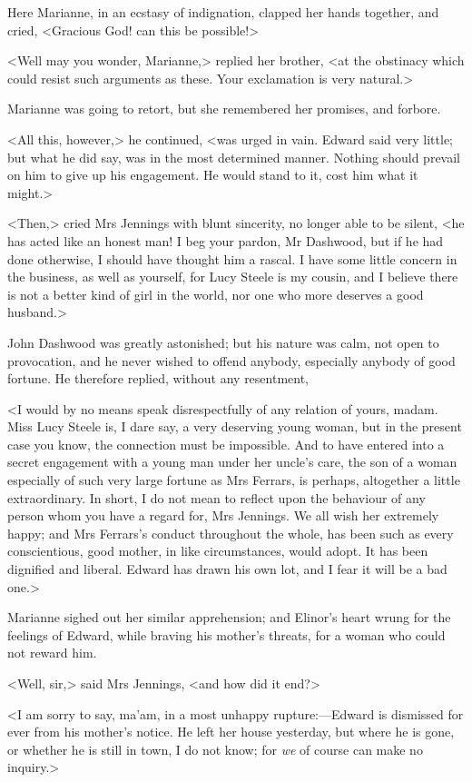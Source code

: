 Here Marianne, in an ecstasy of indignation, clapped her hands together, and cried, <Gracious God! can this be possible!>

<Well may you wonder, Marianne,> replied her brother, <at the obstinacy which could resist such arguments as these. Your exclamation is very natural.>

Marianne was going to retort, but she remembered her promises, and forbore.

<All this, however,> he continued, <was urged in vain. Edward said very little; but what he did say, was in the most determined manner. Nothing should prevail on him to give up his engagement. He would stand to it, cost him what it might.>

<Then,> cried Mrs Jennings with blunt sincerity, no longer able to be silent, <he has acted like an honest man! I beg your pardon, Mr Dashwood, but if he had done otherwise, I should have thought him a rascal. I have some little concern in the business, as well as yourself, for Lucy Steele is my cousin, and I believe there is not a better kind of girl in the world, nor one who more deserves a good husband.>

John Dashwood was greatly astonished; but his nature was calm, not open to provocation, and he never wished to offend anybody, especially anybody of good fortune. He therefore replied, without any resentment,

<I would by no means speak disrespectfully of any relation of yours, madam. Miss Lucy Steele is, I dare say, a very deserving young woman, but in the present case you know, the connection must be impossible. And to have entered into a secret engagement with a young man under her uncle's care, the son of a woman especially of such very large fortune as Mrs Ferrars, is perhaps, altogether a little extraordinary. In short, I do not mean to reflect upon the behaviour of any person whom you have a regard for, Mrs Jennings. We all wish her extremely happy; and Mrs Ferrars's conduct throughout the whole, has been such as every conscientious, good mother, in like circumstances, would adopt. It has been dignified and liberal. Edward has drawn his own lot, and I fear it will be a bad one.>

Marianne sighed out her similar apprehension; and Elinor's heart wrung for the feelings of Edward, while braving his mother's threats, for a woman who could not reward him.

<Well, sir,> said Mrs Jennings, <and how did it end?>

<I am sorry to say, ma'am, in a most unhappy rupture:—Edward is dismissed for ever from his mother's notice. He left her house yesterday, but where he is gone, or whether he is still in town, I do not know; for \textit{we} of course can make no inquiry.>

